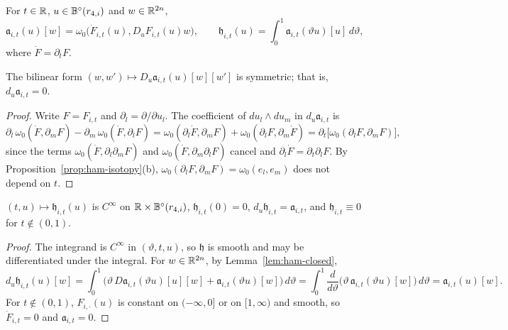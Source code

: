 \begin{definition}\label{def:ham-source-primitive}
For $t\in\mathbb{R}$, $u\in\mathbb{B}^\circ(r_{4,i})$ and $w\in\mathbb{R}^{2n}$,
\[
 \mathfrak a_{i,t}(u)[w]=\omega_0\big(\dot F_{i,t}(u),D_uF_{i,t}(u)w\big),\qquad
 \mathfrak h_{i,t}(u)=\int_0^1\mathfrak a_{i,t}(\vartheta u)[u]\,d\vartheta ,
\]
where $\dot F=\partial_tF$.
\end{definition}

\begin{lemma}\label{lem:ham-closed}
The bilinear form $(w,w')\mapsto D_u\mathfrak a_{i,t}(u)[w][w']$ is symmetric; that is, $d_u\mathfrak a_{i,t}=0$.
\end{lemma}

\begin{proof}
Write $F=F_{i,t}$ and $\partial_l=\partial/\partial u_l$. The coefficient of $du_l\wedge du_m$ in $d_u\mathfrak a_{i,t}$ is
\[
 \partial_l\,\omega_0(\dot F,\partial_mF)-\partial_m\,\omega_0(\dot F,\partial_lF)
 =\omega_0(\partial_l\dot F,\partial_mF)+\omega_0(\partial_lF,\partial_m\dot F)
 =\partial_t\big[\omega_0(\partial_lF,\partial_mF)\big],
\]
since the terms $\omega_0(\dot F,\partial_l\partial_mF)$ and $\omega_0(\dot F,\partial_m\partial_lF)$ cancel and
$\partial_l\dot F=\partial_t\partial_lF$. By Proposition~\ref{prop:ham-isotopy}(b), $\omega_0(\partial_lF,\partial_mF)=\omega_0(e_l,e_m)$
does not depend on $t$.
\end{proof}

\begin{lemma}\label{lem:ham-poincare}
$(t,u)\mapsto\mathfrak h_{i,t}(u)$ is $C^\infty$ on $\mathbb{R}\times\mathbb{B}^\circ(r_{4,i})$, $\mathfrak h_{i,t}(0)=0$,
$d_u\mathfrak h_{i,t}=\mathfrak a_{i,t}$, and $\mathfrak h_{i,t}\equiv0$ for $t\notin(0,1)$.
\end{lemma}

\begin{proof}
The integrand is $C^\infty$ in $(\vartheta,t,u)$, so $\mathfrak h$ is smooth and may be differentiated under the
integral. For $w\in\mathbb{R}^{2n}$, by Lemma~\ref{lem:ham-closed},
\[
 d_u\mathfrak h_{i,t}(u)[w]=\int_0^1\big(\vartheta\,D\mathfrak a_{i,t}(\vartheta u)[u][w]+\mathfrak a_{i,t}(\vartheta u)[w]\big)\,d\vartheta
 =\int_0^1\frac{d}{d\vartheta}\big(\vartheta\,\mathfrak a_{i,t}(\vartheta u)[w]\big)\,d\vartheta=\mathfrak a_{i,t}(u)[w].
\]
For $t\notin(0,1)$, $F_{i,\cdot}(u)$ is constant on $(-\infty,0]$ or on $[1,\infty)$ and smooth, so $\dot F_{i,t}=0$ and
$\mathfrak a_{i,t}=0$.
\end{proof}

